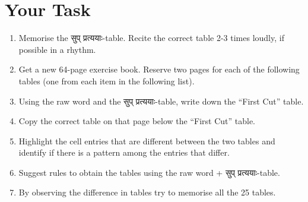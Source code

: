 \documentclass[leqno,fleqn,12pt]{article}%
\newenvironment{ewosp}{\begin{enumerate} \setlength{\itemsep}{0mm}
    \setlength{\parskip}{0mm}}{\end{enumerate}}
\begin{document}
\section{Your Task}

\vspace{-0.5cm}

\begin{ewosp}
\item Memorise the सुप् प्रत्ययाः-table. Recite the correct table 2-3 times loudly, if possible in a rhythm.
\item Get a new 64-page exercise book. Reserve two pages for each of the following tables (one from each item in the following list).
\item Using the raw word and the सुप् प्रत्ययाः-table, write down the ``First Cut'' table.
\item Copy the correct table on that page below the ``First Cut'' table.
\item Highlight the cell entries that are different between the two tables and identify if there is a pattern among the entries that differ. 
\item Suggest rules to obtain the tables using the raw word + सुप् प्रत्ययाः-table.
\item By observing the difference in tables try to memorise all the 25 tables.
\end{ewosp}

\clearpage
\end{document}
